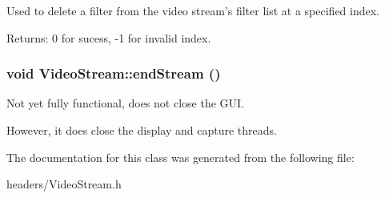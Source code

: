 Used to delete a filter from the video stream's filter list at a specified index.

\begin{Desc}
\item[Returns:]0 for sucess, -1 for invalid index. \end{Desc}
\subsubsection{\setlength{\rightskip}{0pt plus 5cm}void VideoStream::endStream ()}\label{classVideoStream_cf268ad22ed69e13185153716d68a314}


Not yet fully functional, does not close the GUI.

However, it does close the display and capture threads. 

The documentation for this class was generated from the following file:\begin{CompactItemize}
\item 
headers/VideoStream.h\end{CompactItemize}
